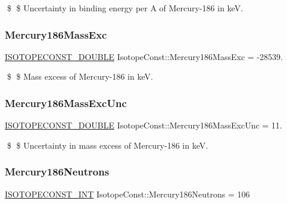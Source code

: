 \$ \$ Uncertainty in binding energy per A of Mercury-\/186 in keV. \mbox{\label{group___isotope_const-_mercury-_hg186_gaa486a18381e5afef36969aa7e3eb75c1}} 
\subsubsection{\texorpdfstring{Mercury186\+Mass\+Exc}{Mercury186MassExc}}
{\footnotesize\ttfamily \mbox{\hyperlink{group___isotope_const-_macros_ga8f45a7272ce02c0b4c65c44636ed719a}{I\+S\+O\+T\+O\+P\+E\+C\+O\+N\+S\+T\+\_\+\+D\+O\+U\+B\+LE}} Isotope\+Const\+::\+Mercury186\+Mass\+Exc = -\/28539.}

\$ \$ Mass excess of Mercury-\/186 in keV. \mbox{\label{group___isotope_const-_mercury-_hg186_gae25530b5104aa4a4f2bf1f048fb3f1d6}} 
\subsubsection{\texorpdfstring{Mercury186\+Mass\+Exc\+Unc}{Mercury186MassExcUnc}}
{\footnotesize\ttfamily \mbox{\hyperlink{group___isotope_const-_macros_ga8f45a7272ce02c0b4c65c44636ed719a}{I\+S\+O\+T\+O\+P\+E\+C\+O\+N\+S\+T\+\_\+\+D\+O\+U\+B\+LE}} Isotope\+Const\+::\+Mercury186\+Mass\+Exc\+Unc = 11.}

\$ \$ Uncertainty in mass excess of Mercury-\/186 in keV. \mbox{\label{group___isotope_const-_mercury-_hg186_ga69b4b099cb39fcc9a1ffc39c8e504890}} 
\subsubsection{\texorpdfstring{Mercury186\+Neutrons}{Mercury186Neutrons}}
{\footnotesize\ttfamily \mbox{\hyperlink{group___isotope_const-_macros_ga5f18360b3e99483a35c32d789e62621c}{I\+S\+O\+T\+O\+P\+E\+C\+O\+N\+S\+T\+\_\+\+I\+NT}} Isotope\+Const\+::\+Mercury186\+Neutrons = 106}

